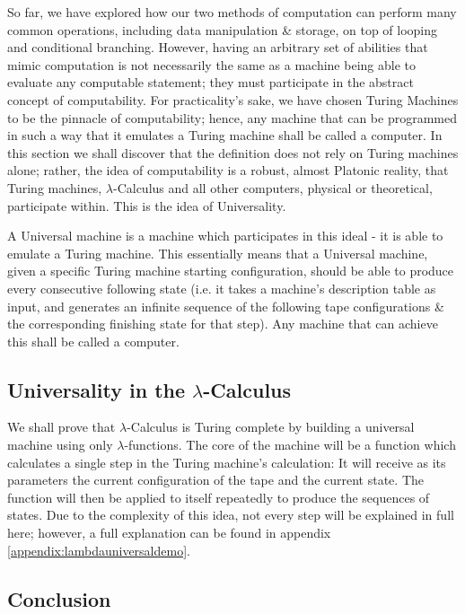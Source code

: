 \documentclass[Master.tex]{subfiles}
\begin{document}
So far, we have explored how our two methods of computation can perform many common operations, including data manipulation \& storage, on top of looping and conditional branching. However, having an arbitrary set of abilities that mimic computation is not necessarily the same as a machine being able to evaluate any computable statement; they must participate in the abstract concept of computability. For practicality's sake, we have chosen Turing Machines to be the pinnacle of computability; hence, any machine that can be programmed in such a way that it emulates a Turing machine shall be called a computer. In this section we shall discover that the definition does not rely on Turing machines alone; rather, the idea of computability is a robust, almost Platonic reality, that Turing machines, $\lambda$-Calculus and all other computers, physical or theoretical, participate within. This is the idea of Universality.

A Universal machine is a machine which participates in this ideal - it is able to emulate a Turing machine. This essentially means that a Universal machine, given a specific Turing machine starting configuration, should be able to produce every consecutive following state (i.e. it takes a machine's description table as input, and generates an infinite sequence of the following tape configurations \& the corresponding finishing state for that step). Any machine that can achieve this shall be called a computer.

\subsection{Universality in the $\lambda$-Calculus}
We shall prove that $\lambda$-Calculus is Turing complete by building a universal machine using only $\lambda$-functions. The core of the machine will be a function which calculates a single step in the Turing machine's calculation: It will receive as its parameters the current configuration of the tape and the current state. The function will then be applied to itself repeatedly to produce the sequences of states. Due to the complexity of this idea, not every step will be explained in full here; however, a full explanation can be found in appendix \ref{appendix:lambdauniversaldemo}.




\subsection{Conclusion}
\end{document}
